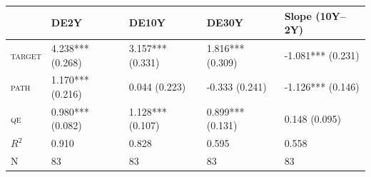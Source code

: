 \begin{tabular}{lllll}
\toprule
 & DE2Y & DE10Y & DE30Y & Slope (10Y--2Y) \\
\midrule
\textsc{target} & 4.238*** (0.268) & 3.157*** (0.331) & 1.816*** (0.309) & -1.081*** (0.231) \\
\textsc{path} & 1.170*** (0.216) & 0.044 (0.223) & -0.333 (0.241) & -1.126*** (0.146) \\
\textsc{qe} & 0.980*** (0.082) & 1.128*** (0.107) & 0.899*** (0.131) & 0.148 (0.095) \\
$R^2$ & 0.910 & 0.828 & 0.595 & 0.558 \\
N & 83 & 83 & 83 & 83 \\
\bottomrule
\end{tabular}
